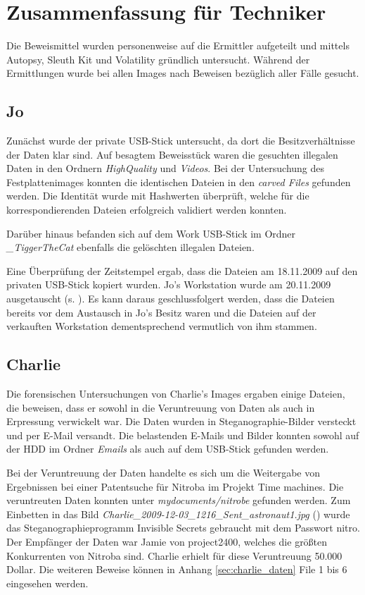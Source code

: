 \chapter{Zusammenfassung für Techniker}
\label{sec:tec}




Die Beweismittel wurden personenweise auf die Ermittler aufgeteilt und mittels Autopsy, Sleuth Kit und Volatility gründlich untersucht. Während der Ermittlungen wurde bei allen Images nach Beweisen bezüglich aller Fälle gesucht.

\section{Jo}
\label{sec:jo}
Zunächst wurde der private USB-Stick untersucht, da dort die Besitzverhältnisse der Daten klar sind. Auf besagtem Beweisstück waren die gesuchten illegalen Daten in den Ordnern \textit{HighQuality} und \textit{Videos}. Bei der Untersuchung des Festplattenimages konnten die identischen Dateien in den \textit{carved Files} gefunden werden. Die Identität wurde mit Hashwerten überprüft, welche für die korrespondierenden Dateien erfolgreich validiert werden konnten. 

Darüber hinaus befanden sich auf dem Work USB-Stick im Ordner \textit{_TiggerTheCat} ebenfalls die gelöschten illegalen Dateien.

Eine Überprüfung der Zeitstempel ergab, dass die Dateien am 18.11.2009 auf den privaten USB-Stick kopiert wurden. Jo's Workstation wurde am 20.11.2009 ausgetauscht (s. ). Es kann daraus geschlussfolgert werden, dass die Dateien bereits vor dem Austausch in Jo's Besitz waren und die Dateien auf der verkauften Workstation  dementsprechend vermutlich von ihm stammen.

\section{Charlie}
\label{sec:charlie}
Die forensischen Untersuchungen von Charlie's Images ergaben einige Dateien, die beweisen, dass er sowohl in die Veruntreuung von Daten als auch in Erpressung verwickelt war. Die Daten wurden in Steganographie-Bilder versteckt und per E-Mail versandt. Die belastenden E-Mails und Bilder konnten sowohl auf der HDD im Ordner \textit{Emails} als auch auf dem USB-Stick gefunden werden. 

Bei der Veruntreuung der Daten handelte es sich um die Weitergabe von Ergebnissen bei einer Patentsuche für Nitroba im Projekt Time machines. Die veruntreuten Daten konnten unter \textit{mydocuments/nitrobe} gefunden werden. Zum Einbetten in das Bild \textit{Charlie_2009-12-03_1216_Sent_astronaut1.jpg} () wurde das Steganographieprogramm Invisible Secrets gebraucht mit dem Passwort nitro. Der Empfänger der Daten war Jamie von project2400, welches die größten Konkurrenten von Nitroba sind. Charlie erhielt für diese Veruntreuung 50.000 Dollar. Die weiteren Beweise können in Anhang \ref{sec:charlie_daten} File 1 bis 6 eingesehen werden.

